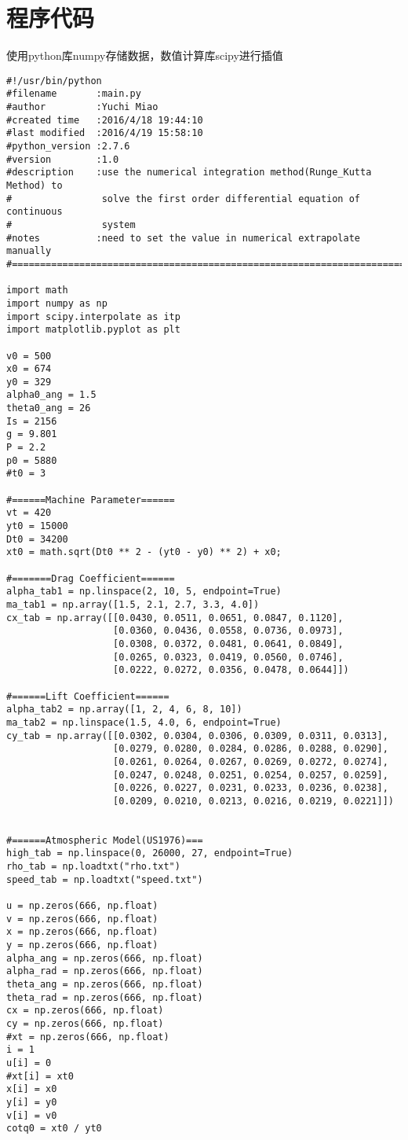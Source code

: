 \documentclass{ctexart}
\begin{document}
\section{程序代码}
使用python库numpy存储数据，数值计算库scipy进行插值
\begin{lstlisting}
#!/usr/bin/python
#filename       :main.py
#author         :Yuchi Miao
#created time	:2016/4/18 19:44:10
#last modified  :2016/4/19 15:58:10
#python_version	:2.7.6
#version        :1.0
#description	:use the numerical integration method(Runge_Kutta Method) to
#                solve the first order differential equation of continuous
#                system
#notes          :need to set the value in numerical extrapolate manually
#===========================================================================

import math
import numpy as np
import scipy.interpolate as itp
import matplotlib.pyplot as plt

v0 = 500
x0 = 674
y0 = 329
alpha0_ang = 1.5
theta0_ang = 26
Is = 2156
g = 9.801
P = 2.2
p0 = 5880
#t0 = 3

#======Machine Parameter======
vt = 420
yt0 = 15000
Dt0 = 34200
xt0 = math.sqrt(Dt0 ** 2 - (yt0 - y0) ** 2) + x0;

#=======Drag Coefficient======
alpha_tab1 = np.linspace(2, 10, 5, endpoint=True)
ma_tab1 = np.array([1.5, 2.1, 2.7, 3.3, 4.0])
cx_tab = np.array([[0.0430, 0.0511, 0.0651, 0.0847, 0.1120],
                   [0.0360, 0.0436, 0.0558, 0.0736, 0.0973],
                   [0.0308, 0.0372, 0.0481, 0.0641, 0.0849],
                   [0.0265, 0.0323, 0.0419, 0.0560, 0.0746],
                   [0.0222, 0.0272, 0.0356, 0.0478, 0.0644]])

#======Lift Coefficient======
alpha_tab2 = np.array([1, 2, 4, 6, 8, 10])
ma_tab2 = np.linspace(1.5, 4.0, 6, endpoint=True)
cy_tab = np.array([[0.0302, 0.0304, 0.0306, 0.0309, 0.0311, 0.0313],
                   [0.0279, 0.0280, 0.0284, 0.0286, 0.0288, 0.0290],
                   [0.0261, 0.0264, 0.0267, 0.0269, 0.0272, 0.0274],
                   [0.0247, 0.0248, 0.0251, 0.0254, 0.0257, 0.0259],
                   [0.0226, 0.0227, 0.0231, 0.0233, 0.0236, 0.0238],
                   [0.0209, 0.0210, 0.0213, 0.0216, 0.0219, 0.0221]])


#======Atmospheric Model(US1976)===
high_tab = np.linspace(0, 26000, 27, endpoint=True)
rho_tab = np.loadtxt("rho.txt")
speed_tab = np.loadtxt("speed.txt")

u = np.zeros(666, np.float)
v = np.zeros(666, np.float)
x = np.zeros(666, np.float)
y = np.zeros(666, np.float)
alpha_ang = np.zeros(666, np.float)
alpha_rad = np.zeros(666, np.float)
theta_ang = np.zeros(666, np.float)
theta_rad = np.zeros(666, np.float)
cx = np.zeros(666, np.float)
cy = np.zeros(666, np.float)
#xt = np.zeros(666, np.float)
i = 1
u[i] = 0
#xt[i] = xt0
x[i] = x0
y[i] = y0
v[i] = v0
cotq0 = xt0 / yt0


\end{lstlisting}
\end{document}
